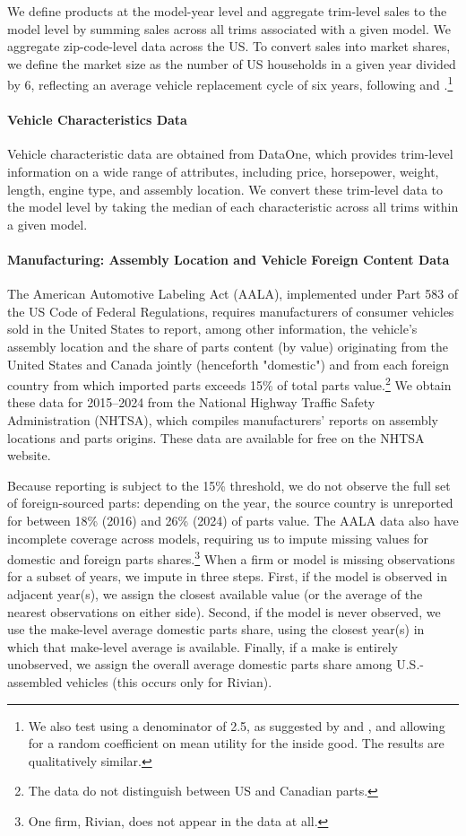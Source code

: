 \documentclass[11pt]{article}
\begin{document}
We define products at the model-year level and aggregate trim-level sales to the model level by summing sales across all trims associated with a given model. We aggregate zip-code-level data across the US. To convert sales into market shares, we define the market size as the number of US households in a given year divided by 6, reflecting an average vehicle replacement cycle of six years, following \cite{cosar_what_2018} and \cite{allcott_effects_2024}.\footnote{We also test using a denominator of 2.5, as suggested by \cite{grieco_evolution_2024} and \cite{sabal_product_2025}, and allowing for a random coefficient on mean utility for the inside good. The results are qualitatively similar.}

\paragraph{Vehicle Characteristics Data}
Vehicle characteristic data are obtained from DataOne, which provides trim-level information on a wide range of attributes, including price, horsepower, weight, length, engine type, and assembly location. We convert these trim-level data to the model level by taking the median of each characteristic across all trims within a given model.

\paragraph{Manufacturing: Assembly Location and Vehicle Foreign Content Data}
The American Automotive Labeling Act (AALA), implemented under Part 583 of the US Code of Federal Regulations, requires manufacturers of consumer vehicles sold in the United States to report, among other information, the vehicle’s assembly location and the share of parts content (by value) originating from the United States and Canada jointly (henceforth "domestic") and from each foreign country from which imported parts exceeds 15\% of total parts value.\footnote{The data do not distinguish between US and Canadian parts.} We obtain these data for 2015--2024 from the National Highway Traffic Safety Administration (NHTSA), which compiles manufacturers’ reports on assembly locations and parts origins. These data are available for free on the NHTSA website.

Because reporting is subject to the 15\% threshold, we do not observe the full set of foreign-sourced parts: depending on the year, the source country is unreported for between 18\% (2016) and 26\% (2024) of parts value. The AALA data also have incomplete coverage across models, requiring us to impute missing values for domestic and foreign parts shares.\footnote{One firm, Rivian, does not appear in the data at all.} When a firm or model is missing observations for a subset of years, we impute in three steps. First, if the model is observed in adjacent year(s), we assign the closest available value (or the average of the nearest observations on either side). Second, if the model is never observed, we use the make-level average domestic parts share, using the closest year(s) in which that make-level average is available. Finally, if a make is entirely unobserved, we assign the overall average domestic parts share among U.S.-assembled vehicles (this occurs only for Rivian).
\end{document}

